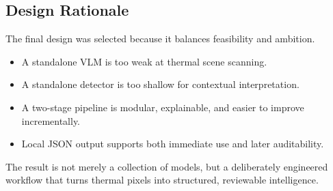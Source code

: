 \subsection{Design Rationale}

The final design was selected because it balances feasibility and ambition.

\begin{itemize}[nosep]
  \item A standalone VLM is too weak at thermal scene scanning.
  \item A standalone detector is too shallow for contextual interpretation.
  \item A two-stage pipeline is modular, explainable, and easier to improve incrementally.
  \item Local JSON output supports both immediate use and later auditability.
\end{itemize}

The result is not merely a collection of models, but a deliberately engineered workflow that
turns thermal pixels into structured, reviewable intelligence.

